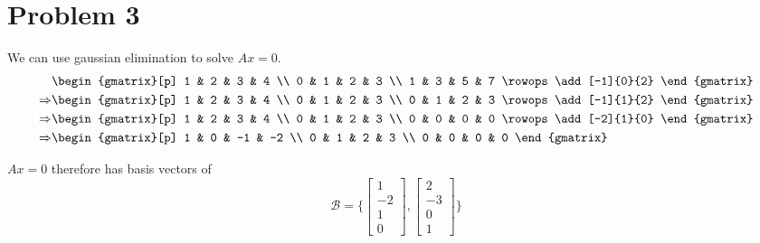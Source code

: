 \section*{Problem 3}
We can use gaussian elimination to solve $Ax = 0$.
\begin{align*}
    & \begin{gmatrix}[p]
        1 & 2 & 3 & 4 \\
        0 & 1 & 2 & 3 \\
        1 & 3 & 5 & 7 
        \rowops
        \add[-1]{0}{2}
      \end{gmatrix} \\
     \Rightarrow & \begin{gmatrix}[p]
        1 & 2 & 3 & 4 \\
        0 & 1 & 2 & 3 \\
        0 & 1 & 2 & 3 
        \rowops
        \add[-1]{1}{2}
      \end{gmatrix} \\
    \Rightarrow & \begin{gmatrix}[p]
        1 & 2 & 3 & 4 \\
        0 & 1 & 2 & 3 \\
        0 & 0 & 0 & 0 
        \rowops
        \add[-2]{1}{0}
      \end{gmatrix} \\
    \Rightarrow & \begin{gmatrix}[p]
        1 & 0 & -1 & -2 \\
        0 & 1 & 2 & 3 \\
        0 & 0 & 0 & 0 
      \end{gmatrix} \\
\end{align*}

$Ax = 0$ therefore has basis vectors of 
\[
    \mathcal{B} = \{
    \begin{bmatrix}1 \\ -2 \\ 1 \\ 0 \end{bmatrix},
    \begin{bmatrix}2 \\ -3 \\ 0 \\ 1 \end{bmatrix}
    \}
\]